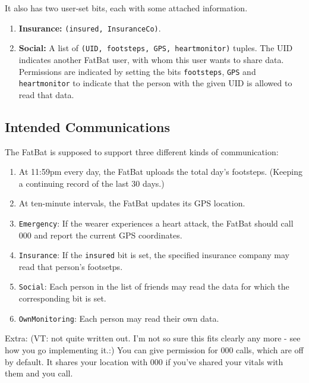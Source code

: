 \documentclass[11pt]{article}
\begin{document}
It also has two user-set bits, each with some attached information.
\begin{enumerate}
	\item {\bf Insurance:} \texttt{(insured, InsuranceCo)}.    
	\item {\bf Social:} A list of  \texttt{(UID, footsteps, {GPS}, heartmonitor)} tuples.  The UID indicates another FatBat user, with whom this user wants to share data.  Permissions are indicated by setting the bits \texttt{footsteps}, \texttt{GPS} and \texttt{heartmonitor} to indicate that the person with the given UID is allowed to read that data.
\end{enumerate}

\subsection{Intended Communications}

The FatBat is supposed to support three different kinds of communication:

\begin{enumerate}[~~\bf{R1}.1]
	\item At 11:59pm every day, the FatBat uploads the total day's footsteps.  (Keeping a continuing record of the last 30 days.)
	\item At ten-minute intervals, the FatBat updates its {GPS} location.

  \item \texttt{Emergency}: If the wearer experiences a heart attack, the FatBat should call 000 and report the current {GPS} coordinates. 
  
  \item \texttt{Insurance}: If the \texttt{insured} bit is set, the specified insurance company may read that person's footsetps.

  \item \texttt{Social}: Each person in the list of friends may read the data for which the corresponding bit is set.

	\item \texttt{OwnMonitoring}: Each person may read their own data.


\end{enumerate}

Extra:  (VT: not quite written out.  I'm not so sure this fits clearly any more - see how you go implementing it.:) You can give permission for 000 calls, which are off by default.  It shares your location with 000 if you've shared your vitals with them and you call.  
\end{document}
